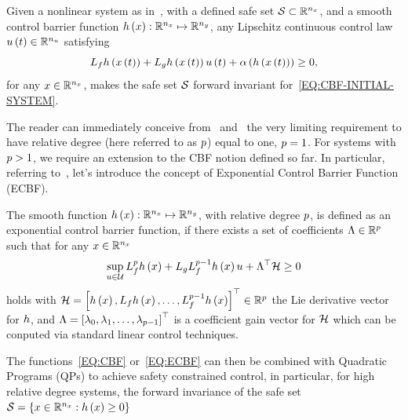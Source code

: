 \begin{theorem}%
    \label{TH:SAFE-INVARIANCE}
    Given a nonlinear system as in~, with a defined safe set $\mathcal{S} \subset \mathbb{R}^{n_{x}}$,
    and a smooth control barrier function $h \left( x \right) : \mathbb{R}^{n_{x}} \mapsto \mathbb{R}^{n_{y}}$, any Lipschitz continuous
    control law $u \left( t \right) \in \mathbb{R}^{n_{u}}$ satisfying
    \begin{equation}%
        \label{EQ:CBF}
        L_{\xfun} \yfun \lp \xx \lp t \rp\rp + L_{\ufun} \yfun \lp \xx \lp t \rp\rp \uu \lp t \rp + \alpha \lp \yfun \lp \xx \lp t \rp\rp\rp \ge 0,
    \end{equation}
    for any $x \in \mathbb{R}^{n_{x}}$, makes the safe set $\mathcal{S}$ forward invariant for~\eqref{EQ:CBF-INITIAL-SYSTEM}.
\end{theorem}
The reader can immediately conceive from~ and~ the very limiting
requirement to have relative degree (here referred to as $p$) equal to one, $p = 1$.
For systems with $p > 1$, we require an extension to the CBF notion defined so far. In particular, referring
to~\cite{nguyen2016exponential, xiao2019control}, let's introduce the concept of Exponential Control Barrier Function (ECBF).
\begin{definition}
    The smooth function $h \left( x \right): \mathbb{R}^{n_{x}} \mapsto \mathbb{R}^{n_{y}}$, with relative degree $p$, is defined as an
    exponential control barrier function, if there exists a set of coefficients $ \Lambda \in \mathbb{R}^{p}$ such that for any $x \in \mathbb{R}^{n_{x}}$
    \begin{equation}%
        \label{EQ:ECBF}
        \sup_{\uu \in \uset} L^{\order}_{\xfun} \yfun \lp \xx \rp + L_{\ufun}L_{\xfun}^{\order-1} \yfun \lp \xx \rp \uu + \Lambda\T \HH \ge 0
    \end{equation}
    holds with $\mathcal{H} = \left[ h \left( x \right), L_{f} h \left( x \right), \dots, L^{p-1}_{f} h \left( x \right)\right]^{\top} \in \mathbb{R}^{p}$
    the Lie derivative vector for $h$, and $\Lambda = \left[ \lambda_0, \lambda_1, \dots, \lambda_{p-1} \right]^{\top}$ is a
    coefficient gain vector for $\mathcal{H}$ which can be conputed via standard linear control techniques.
\end{definition}
The functions~\eqref{EQ:CBF} or~\eqref{EQ:ECBF} can then be combined with Quadratic Programs (QPs) to achieve safety constrained control,
in particular, for high relative degree systems, the forward invariance of the safe set $\mathcal{S} = \{ x \in \mathbb{R}^{n_{x}} : h \left( x \right) \ge 0\}$
